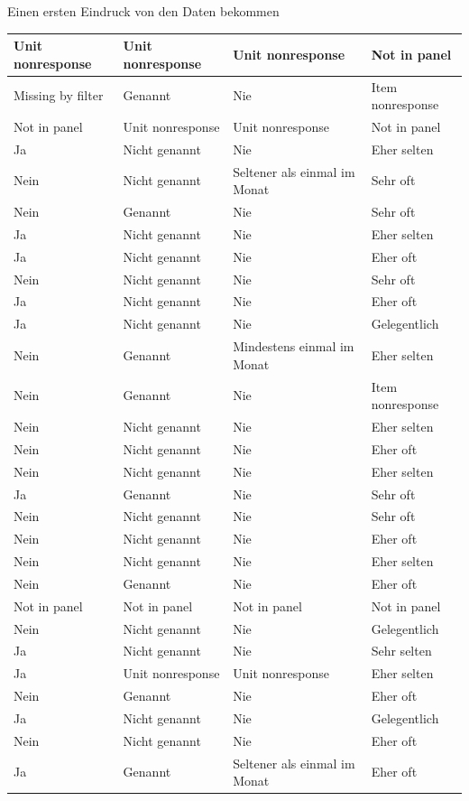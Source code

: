 \documentclass[ignorenonframetext,]{beamer}
\begin{document}
\begin{frame}{Einen ersten Eindruck von den Daten bekommen}
\begin{tabular}{l|l|l|l}
\hline
Unit nonresponse & Unit nonresponse & Unit nonresponse & Not in panel\\
\hline
Missing by filter & Genannt & Nie & Item nonresponse\\
\hline
Not in panel & Unit nonresponse & Unit nonresponse & Not in panel\\
\hline
Ja & Nicht genannt & Nie & Eher selten\\
\hline
Nein & Nicht genannt & Seltener als einmal im Monat & Sehr oft\\
\hline
Nein & Genannt & Nie & Sehr oft\\
\hline
Ja & Nicht genannt & Nie & Eher selten\\
\hline
Ja & Nicht genannt & Nie & Eher oft\\
\hline
Nein & Nicht genannt & Nie & Sehr oft\\
\hline
Ja & Nicht genannt & Nie & Eher oft\\
\hline
Ja & Nicht genannt & Nie & Gelegentlich\\
\hline
Nein & Genannt & Mindestens einmal im Monat & Eher selten\\
\hline
Nein & Genannt & Nie & Item nonresponse\\
\hline
Nein & Nicht genannt & Nie & Eher selten\\
\hline
Nein & Nicht genannt & Nie & Eher oft\\
\hline
Nein & Nicht genannt & Nie & Eher selten\\
\hline
Ja & Genannt & Nie & Sehr oft\\
\hline
Nein & Nicht genannt & Nie & Sehr oft\\
\hline
Nein & Nicht genannt & Nie & Eher oft\\
\hline
Nein & Nicht genannt & Nie & Eher selten\\
\hline
Nein & Genannt & Nie & Eher oft\\
\hline
Not in panel & Not in panel & Not in panel & Not in panel\\
\hline
Nein & Nicht genannt & Nie & Gelegentlich\\
\hline
Ja & Nicht genannt & Nie & Sehr selten\\
\hline
Ja & Unit nonresponse & Unit nonresponse & Eher selten\\
\hline
Nein & Genannt & Nie & Eher oft\\
\hline
Ja & Nicht genannt & Nie & Gelegentlich\\
\hline
Nein & Nicht genannt & Nie & Eher oft\\
\hline
Ja & Genannt & Seltener als einmal im Monat & Eher oft\\

\end{tabular}
\end{frame}
\end{document}
